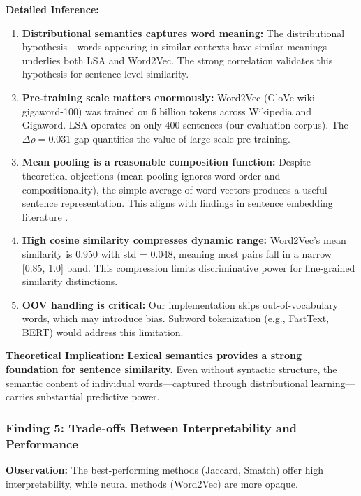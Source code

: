 \documentclass[11pt,a4paper]{article}
\begin{document}
\textbf{Detailed Inference:}
\begin{enumerate}
    \item \textbf{Distributional semantics captures word meaning:} The distributional hypothesis---words appearing in similar contexts have similar meanings---underlies both LSA and Word2Vec. The strong correlation validates this hypothesis for sentence-level similarity.
    
    \item \textbf{Pre-training scale matters enormously:} Word2Vec (GloVe-wiki-gigaword-100) was trained on 6 billion tokens across Wikipedia and Gigaword. LSA operates on only 400 sentences (our evaluation corpus). The $\Delta\rho = 0.031$ gap quantifies the value of large-scale pre-training.
    
    \item \textbf{Mean pooling is a reasonable composition function:} Despite theoretical objections (mean pooling ignores word order and compositionality), the simple average of word vectors produces a useful sentence representation. This aligns with findings in sentence embedding literature \cite{arora2017simple}.
    
    \item \textbf{High cosine similarity compresses dynamic range:} Word2Vec's mean similarity is 0.950 with std = 0.048, meaning most pairs fall in a narrow [0.85, 1.0] band. This compression limits discriminative power for fine-grained similarity distinctions.
    
    \item \textbf{OOV handling is critical:} Our implementation skips out-of-vocabulary words, which may introduce bias. Subword tokenization (e.g., FastText, BERT) would address this limitation.
\end{enumerate}

\textbf{Theoretical Implication:} \textbf{Lexical semantics provides a strong foundation for sentence similarity.} Even without syntactic structure, the semantic content of individual words---captured through distributional learning---carries substantial predictive power.

\subsubsection{Finding 5: Trade-offs Between Interpretability and Performance}

\textbf{Observation:} The best-performing methods (Jaccard, Smatch) offer high interpretability, while neural methods (Word2Vec) are more opaque.
\end{document}
